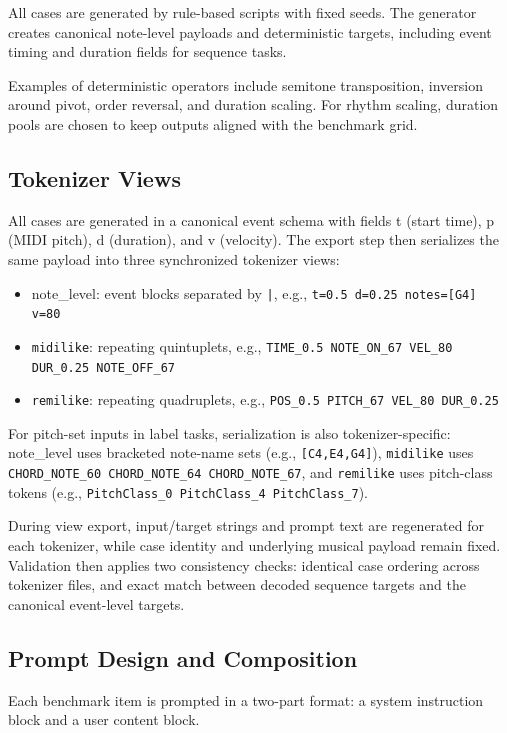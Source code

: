 \documentclass{article}
\begin{document}
All cases are generated by rule-based scripts with fixed seeds. The generator creates canonical note-level payloads and deterministic targets, including event timing and duration fields for sequence tasks.

Examples of deterministic operators include semitone transposition, inversion around pivot, order reversal, and duration scaling. For rhythm scaling, duration pools are chosen to keep outputs aligned with the benchmark grid.

\subsection{Tokenizer Views}

All cases are generated in a canonical event schema with fields t (start time), p (MIDI pitch), d (duration), and v (velocity). The export step then serializes the same payload into three synchronized tokenizer views:
\begin{itemize}
    \item note\_level: event blocks separated by \texttt{|}, e.g., \texttt{t=0.5 d=0.25 notes=[G4] v=80}
    \item \texttt{midilike}: repeating quintuplets, e.g., \texttt{TIME\_0.5 NOTE\_ON\_67 VEL\_80 DUR\_0.25 NOTE\_OFF\_67}
    \item \texttt{remilike}: repeating quadruplets, e.g., \texttt{POS\_0.5 PITCH\_67 VEL\_80 DUR\_0.25}
\end{itemize}

For pitch-set inputs in label tasks, serialization is also tokenizer-specific: note\_level uses bracketed note-name sets (e.g., \texttt{[C4,E4,G4]}), \texttt{midilike} uses \texttt{CHORD\_NOTE\_60 CHORD\_NOTE\_64 CHORD\_NOTE\_67}, and \texttt{remilike} uses pitch-class tokens (e.g., \texttt{PitchClass\_0 PitchClass\_4 PitchClass\_7}).

During view export, input/target strings and prompt text are regenerated for each tokenizer, while case identity and underlying musical payload remain fixed. Validation then applies two consistency checks: identical case ordering across tokenizer files, and exact match between decoded sequence targets and the canonical event-level targets.

\subsection{Prompt Design and Composition}

Each benchmark item is prompted in a two-part format: a system instruction block and a user content block.
\end{document}
